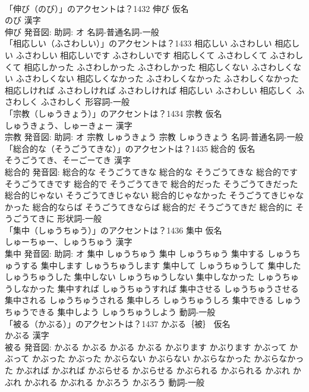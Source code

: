 \documentclass[8pt]{extreport}
\begin{document}
\begin{CJK}{UTF8}{min}
\\	「伸び（のび）」のアクセントは？1432	伸び 仮名　
\\	のび 漢字　
\\	伸び 発音図: 助詞: オ							名詞-普通名詞-一般 
\\	「相応しい（ふさわしい）」のアクセントは？1433		相応しい ふさわしい		相応しい ふさわしい 相応しいです ふさわしいです 相応しくて ふさわしくて ふさわしくて 相応しかった ふさわしかった ふさわしかった 相応しくない ふさわしくない ふさわしくない 相応しくなかった ふさわしくなかった ふさわしくなかった 相応しければ ふさわしければ ふさわしければ 相応しい ふさわしい 相応しく ふさわしく ふさわしく				形容詞-一般 
\\	「宗教（しゅうきょう）」のアクセントは？1434	宗教 仮名　
\\	しゅうきょう、しゅーきょー 漢字　
\\	宗教 発音図: 助詞: オ	宗教 しゅうきょう		宗教 しゅうきょう				名詞-普通名詞-一般 
\\	「総合的な（そうごうてきな）」のアクセントは？1435	総合的 仮名　
\\	そうごうてき、そーごーてき 漢字　
\\	総合的 発音図:	総合的な そうごうてきな		総合的な そうごうてきな 総合的です そうごうてきです 総合的で そうごうてきで 総合的だった そうごうてきだった 総合的じゃない そうごうてきじゃない 総合的じゃなかった そうごうてきじゃなかった 総合的ならば そうごうてきならば 総合的だ そうごうてきだ 総合的に そうごうてきに				形状詞-一般 
\\	「集中（しゅうちゅう）」のアクセントは？1436	集中 仮名　
\\	しゅーちゅー、しゅうちゅう 漢字　
\\	集中 発音図: 助詞: オ	集中 しゅうちゅう		集中 しゅうちゅう 集中する しゅうちゅうする 集中します しゅうちゅうします 集中して しゅうちゅうして 集中した しゅうちゅうした 集中しない しゅうちゅうしない 集中しなかった しゅうちゅうしなかった 集中すれば しゅうちゅうすれば 集中させる しゅうちゅうさせる 集中される しゅうちゅうされる 集中しろ しゅうちゅうしろ 集中できる しゅうちゅうできる 集中しよう しゅうちゅうしよう				動詞-一般 
\\	「被る（かぶる）」のアクセントは？1437	かぶる｛被｝ 仮名　
\\	かぶる 漢字　
\\	被る 発音図:	かぶる かぶる		かぶる かぶる かぶります かぶります かぶって かぶって かぶった かぶった かぶらない かぶらない かぶらなかった かぶらなかった かぶれば かぶれば かぶらせる かぶらせる かぶられる かぶられる かぶれ かぶれ かぶれる かぶれる かぶろう かぶろう				動詞-一般 

\end{CJK}
\end{document}
